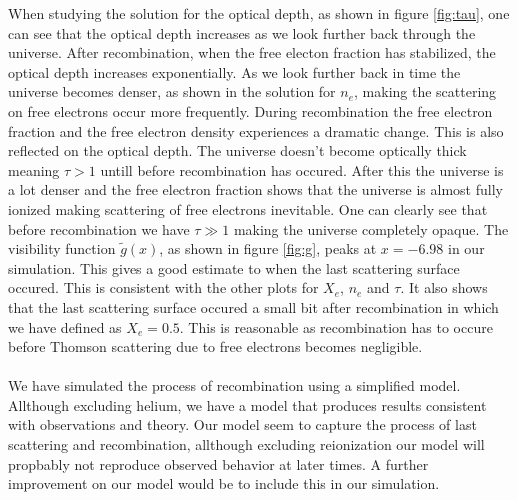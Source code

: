 \documentclass[onecolumn]{aastex62}
\begin{document}
When studying the solution for the optical depth, as shown in figure \ref{fig:tau}, one can see that the optical depth increases as we look further back through the universe. After recombination, when the free electon fraction has stabilized, the optical depth increases exponentially. As we look further back in time the universe becomes denser, as shown in the solution for $n_e$, making the scattering on free electrons occur more frequently. During recombination the free electron fraction and the free electron density experiences a dramatic change. This is also reflected on the optical depth. The universe doesn't become optically thick meaning $\tau>1$ untill before recombination has occured. After this the universe is a lot denser and the free electron fraction shows that the universe is almost fully ionized making scattering of free electrons inevitable. One can clearly see that before recombination we have $\tau\gg 1$ making the universe completely opaque. The visibility function $\widetilde{g}(x)$, as shown in figure \ref{fig:g}, peaks at $x=-6.98$ in our simulation. This gives a good estimate to when the last scattering surface occured. This is consistent with the other plots for $X_e$, $n_e$ and $\tau$. It also shows that the last scattering surface occured a small bit after recombination in which we have defined as $X_e=0.5$. This is reasonable as recombination has to occure before Thomson scattering due to free electrons becomes negligible. \\\\\indent
We have simulated the process of recombination using a simplified model. Allthough excluding helium, we have a model that produces results consistent with observations and theory. Our model seem to capture the process of last scattering and recombination, allthough excluding reionization our model will propbably not reproduce observed behavior at later times. A further improvement on our model would be to include this in our simulation.






\end{document}
